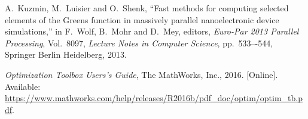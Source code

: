 \documentclass[12pt]{article}
\numberwithin{equation}{section}
\numberwithin{table}{section}
\numberwithin{figure}{section}
\begin{document}
\begin{thebibliography}{99}
A.~Kuzmin, M.~Luisier and O.~Shenk, ``Fast methods for computing selected elements of the Greens function in massively parallel nanoelectronic device simulations,'' in F.~Wolf, B.~Mohr and D.~Mey, editors, \emph{Euro-Par 2013 Parallel Processing}, Vol.~8097, \emph{Lecture Notes in Computer Science}, pp.~533–-544, Springer Berlin Heidelberg, 2013.

\emph{Optimization Toolbox Users's Guide}, The MathWorks, Inc., 2016.
  [Online]. Available: \url{https://www.mathworks.com/help/releases/R2016b/pdf_doc/optim/optim_tb.pdf}.

\end{thebibliography}
\end{document}
